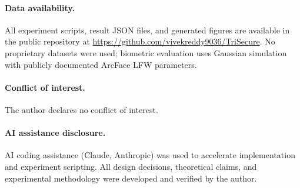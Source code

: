 \documentclass[preprint,12pt]{elsarticle}
\begin{document}
\paragraph{Data availability.}
All experiment scripts, result JSON files, and generated figures are
available in the public repository at
\url{https://github.com/vivekreddy9036/TriSecure}.
No proprietary datasets were used; biometric evaluation uses Gaussian
simulation with publicly documented ArcFace LFW parameters.

\paragraph{Conflict of interest.} The author declares no conflict of interest.

\paragraph{AI assistance disclosure.} AI coding assistance (Claude, Anthropic)
was used to accelerate implementation and experiment scripting. All
design decisions, theoretical claims, and experimental methodology were
developed and verified by the author.



\end{document}
